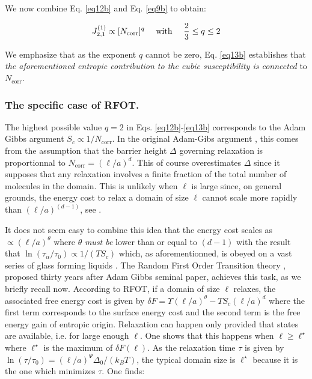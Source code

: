 \documentclass[single column,pre]{revtex4}
\begin{document}
We now combine Eq. \ref{eq12b} and Eq. \ref{eq9b} to obtain: 

\begin{equation}
J_{2,1}^{(1)}  \propto    [N_{\text{corr}} ]^q  \quad \hbox{\ with\ } \quad \frac{2}{3} \le q \le 2 
\label{eq13b}
\end{equation}

We emphasize that as the exponent $q$ cannot be zero, Eq. \ref{eq13b} establishes that \textit{the aforementioned entropic contribution to the cubic 
susceptibility is connected} to $N_{\text{corr}}$. 

\subsubsection{\label{partA2-2} The specific case of RFOT.}

The highest possible value $q=2$ in Eqs. \ref{eq12b}-\ref{eq13b} corresponds to the Adam Gibbs argument $S_c \propto 1/N_{\text{corr}}$. In the original Adam-Gibs argument \cite{Ada65,Bou04,note3}, this comes 
from the assumption that the barrier height $\Delta$ governing relaxation is proportionnal to $N_{\text{corr}}=(\ell /a)^d$. 
This of course overestimates $\Delta$ since it supposes that any relaxation involves a finite fraction of the total number of molecules in the domain. 
This is unlikely when $\ell$ is large since, on general grounds, the energy cost to relax a domain of 
size $\ell$ cannot scale more rapidly than $(\ell/a)^{(d-1)}$, see \cite{note4}. 
 
It does not seem easy to combine this idea that the energy cost scales as $\propto (\ell /a)^\theta$ where $\theta$ \textit{must be} lower than or equal to $(d-1)$ with the result 
 that $\ln(\tau_{\alpha}/\tau_0) \propto 1/(TS_c)$ which, as aforementionned, is obeyed on a vast series of glass forming liquids \cite{Ric98}. The Random First Order Transition 
 theory \cite{RFOT}, proposed thirty years 
 after Adam Gibbs seminal paper, achieves this task, as we briefly recall now. According to RFOT, 
if a domain of size $\ell$ relaxes, the associated free energy cost is given by $\delta F = \Upsilon (\ell / a)^\theta - T S_c (\ell /a)^d$ where the first term corresponds to the 
surface energy cost and the second term is the free energy gain of entropic origin. Relaxation can happen only provided that states are 
available, i.e. for large enough $\ell$. One shows \cite{Bou04} that this happens when $\ell \ge \ell^\star$  where $\ell^{\star}$ is the maximum of $\delta F(\ell)$. 
As the relaxation time $\tau$ is given by $\ln{(\tau/ \tau_0)} = (\ell/a)^\Psi \Delta_0 /(k_B T)$, the typical domain size is $\ell^\star$ because it is the one 
which minimizes $\tau$. One finds:   
\end{document}
